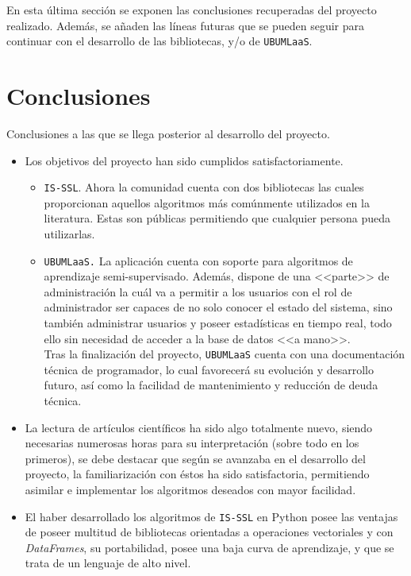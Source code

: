
En esta última sección se exponen las conclusiones recuperadas del proyecto realizado. Además, se añaden las líneas futuras que se pueden seguir para continuar con el desarrollo de las bibliotecas, y/o de \texttt{UBUMLaaS}.

\section{Conclusiones}
Conclusiones a las que se llega posterior al desarrollo del proyecto.

\begin{itemize}
\item Los objetivos del proyecto han sido cumplidos satisfactoriamente.
	\begin{itemize}
	\item \texttt{IS-SSL}. Ahora la comunidad cuenta con dos bibliotecas las cuales proporcionan aquellos algoritmos más comúnmente utilizados en la literatura. Estas son públicas permitiendo que cualquier persona pueda utilizarlas.
	\item \texttt{UBUMLaaS.} La aplicación cuenta con soporte para algoritmos de aprendizaje semi-supervisado. Además, dispone de una <<parte>> de administración la cuál va a permitir a los usuarios con el rol de administrador ser capaces de no solo conocer el estado del sistema, sino también administrar usuarios y poseer estadísticas en tiempo real, todo ello sin necesidad de acceder a la base de datos <<a mano>>.\\
	Tras la finalización del proyecto, \texttt{UBUMLaaS} cuenta con una documentación técnica de programador, lo cual favorecerá su evolución y desarrollo futuro, así como la facilidad de mantenimiento y reducción de deuda técnica.
	\end{itemize}
\item La lectura de artículos científicos ha sido algo totalmente nuevo, siendo necesarias numerosas horas para su interpretación (sobre todo en los primeros), se debe destacar que según se avanzaba en el desarrollo del proyecto, la familiarización con éstos ha sido satisfactoria, permitiendo asimilar e implementar los algoritmos deseados con mayor facilidad.
\item El haber desarrollado los algoritmos de \texttt{IS-SSL} en Python posee las ventajas de poseer multitud de bibliotecas orientadas a operaciones vectoriales y con \textit{DataFrames}, su portabilidad, posee una baja curva de aprendizaje, y que se trata de un lenguaje de alto nivel.

\end{itemize}
